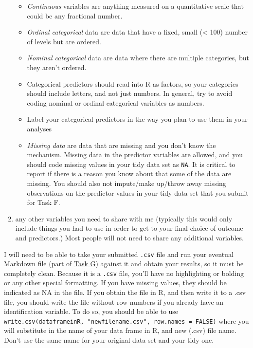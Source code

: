 \documentclass[]{book}
\providecommand{\tightlist}{%
  \setlength{\itemsep}{0pt}\setlength{\parskip}{0pt}}
\theoremstyle{definition}
\theoremstyle{definition}
\theoremstyle{definition}
\theoremstyle{remark}
\begin{document}
\begin{enumerate}
  \begin{itemize}
  \tightlist
  \item
    \emph{Continuous} variables are anything measured on a quantitative
    scale that could be any fractional number.
  \item
    \emph{Ordinal categorical} data are data that have a fixed, small
    (\textless{} 100) number of levels but are ordered.
  \item
    \emph{Nominal categorical} data are data where there are multiple
    categories, but they aren't ordered.
  \item
    Categorical predictors should read into R as factors, so your
    categories should include letters, and not just numbers. In general,
    try to avoid coding nominal or ordinal categorical variables as
    numbers.
  \item
    Label your categorical predictors in the way you plan to use them in
    your analyses
  \item
    \emph{Missing data} are data that are missing and you don't know the
    mechanism. Missing data in the predictor variables are allowed, and
    you should code missing values in your tidy data set as \texttt{NA}.
    It is critical to report if there is a reason you know about that
    some of the data are missing. You should also not impute/make
    up/throw away missing observations on the predictor values in your
    tidy data set that you submit for Task F.
  \end{itemize}
\item
  any other variables you need to share with me (typically this would
  only include things you had to use in order to get to your final
  choice of outcome and predictors.) Most people will not need to share
  any additional variables.
\end{enumerate}

I will need to be able to take your submitted \texttt{.csv} file and run
your eventual Markdown file (part of \protect\hyperlink{taskG}{Task G})
against it and obtain your results, so it must be completely clean.
Because it is a \texttt{.csv} file, you'll have no highlighting or
bolding or any other special formatting. If you have missing values,
they should be indicated as NA in the file. If you obtain the file in R,
and then write it to a .csv file, you should write the file without row
numbers if you already have an identification variable. To do so, you
should be able to use
\texttt{write.csv(dataframeinR,\ "newfilename.csv",\ row.names\ =\ FALSE)}
where you will substitute in the name of your data frame in R, and new
(.csv) file name. Don't use the same name for your original data set and
your tidy one.
\end{document}
